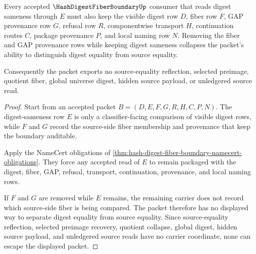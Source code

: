 \begin{theorem}
\label{thm:hash-digest-fiber-boundary-nonescape}
Every accepted $\HashDigestFiberBoundaryUp$ consumer that reads digest sameness through $E$ must also keep the visible digest row $D$, fiber row $F$, GAP provenance row $G$, refusal row $R$, componentwise transport $H$, continuation routes $C$, package provenance $P$, and local naming row $N$. Removing the fiber and GAP provenance rows while keeping digest sameness collapses the packet's ability to distinguish digest equality from source equality.

Consequently the packet exports no source-equality reflection, selected preimage, quotient fiber, global universe digest, hidden source payload, or unledgered source read.
\end{theorem}
\begin{proof}
Start from an accepted packet $B=(D,E,F,G,R,H,C,P,N)$. The digest-sameness row $E$ is only a classifier-facing comparison of visible digest rows, while $F$ and $G$ record the source-side fiber membership and provenance that keep the boundary auditable.

Apply the NameCert obligations of \autoref{thm:hash-digest-fiber-boundary-namecert-obligations}. They force any accepted read of $E$ to remain packaged with the digest, fiber, GAP, refusal, transport, continuation, provenance, and local naming rows.

If $F$ and $G$ are removed while $E$ remains, the remaining carrier does not record which source-side fiber is being compared. The packet therefore has no displayed way to separate digest equality from source equality. Since source-equality reflection, selected preimage recovery, quotient collapse, global digest, hidden source payload, and unledgered source reads have no carrier coordinate, none can escape the displayed packet.
\end{proof}

